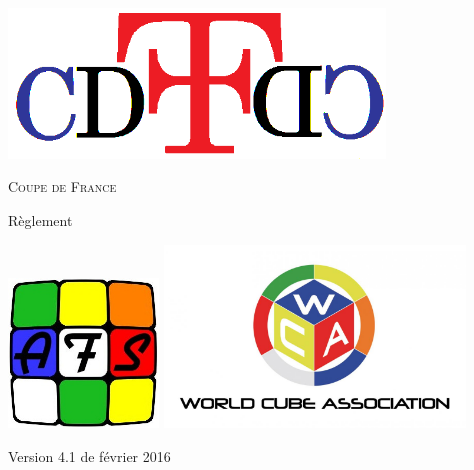 \documentclass[10pt,a4paper]{article}
\newcommand{\cdf}{Coupe de France}
\newcommand{\3}{$3\times3$}
\newcommand{\4}{$4\times4$}
\newcommand{\2}{$2\times2$}
\begin{document}
\begin{titlepage}
\begin{center}

\vfill

\includegraphics[width=10cm]{logo.png}

\vskip 3cm

\Huge{\textsc{\cdf}}

\vskip 1cm

\Huge{Règlement}

\vskip 3cm


\includegraphics[width=4cm]{logoAFS.jpg} \hskip 1cm
\includegraphics[width=8cm]{logoWCA.jpg}

\vfill

\large{Version 4.1 de février 2016}


\end{center}
\end{titlepage}


\end{document}
